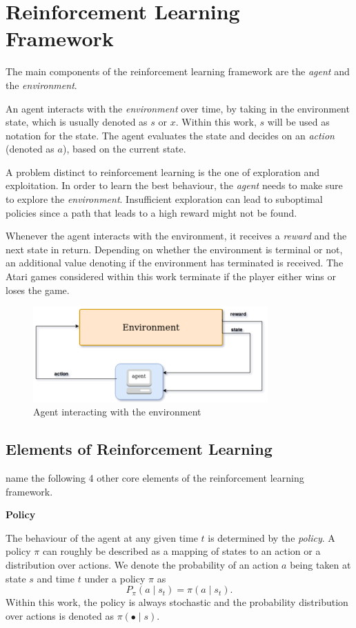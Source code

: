 \section{Reinforcement Learning Framework}\raggedbottom 
The main components of the reinforcement learning framework are the \textit{agent} and the \textit{environment}.

An agent interacts with the \textit{environment} over time, by taking in the environment state, which is usually denoted as $s$ or $x$. Within this work, $s$ will be used as notation for the state.
The agent evaluates the state and decides on an \textit{action} (denoted as $a$), based on the current state. 

A problem distinct to reinforcement learning is the one of exploration and exploitation. In order to learn the best behaviour, the \textit{agent} needs to make sure to explore the \textit{environment}. Insufficient exploration can lead to suboptimal policies since a path that leads to a high reward might not be found. 

Whenever the agent interacts with the environment, it receives a \textit{reward} and the next state in return.
Depending on whether the environment is terminal or not, an additional value denoting if the environment has terminated is received. 
The Atari games considered within this work terminate if the player either wins or loses the game.

\begin{figure}
\includegraphics[width=90mm]{bilder/RLFramework.png}
\caption{Agent interacting with the environment}
\end{figure}


\subsection{Elements of Reinforcement Learning}
\citet{Sut98} name the following 4 other core elements of the reinforcement learning framework.

\textbf{Policy}

The behaviour of the agent at any given time $t$ is determined by the \textit{policy}. A policy $\pi$ can roughly be described as a mapping of states to an action or a distribution over actions. 
We denote the probability of an action $a$ being taken at state $s$ and time $t$ under a policy $\pi$ as
\begin{equation}
P_\pi( a \mid s_t) = \pi(a \mid s_t) . 
\end{equation}
Within this work, the policy is always stochastic and the probability distribution over actions is denoted as $\pi (\bullet \mid s)$.
\pagebreak

